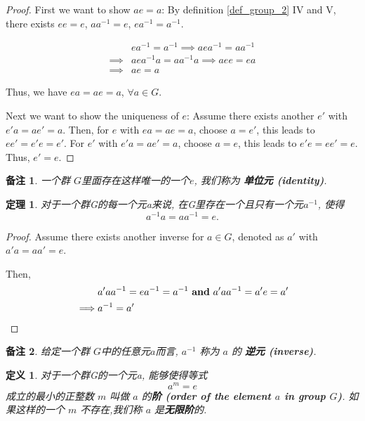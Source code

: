 \documentclass[utf8]{ctexbook}
\newtheorem{theorem}{定理}[section]
\newtheorem{definition}{定义}[section]
\newtheorem{memo}{备注}[section]
\begin{document}
\begin{proof}
First we want to show $ae = a$: By definition \ref{def_group_2} IV and V, there exists $ee=e$, $a a^{-1} = e$, $e a^{-1} =  a^{-1}$.

\begin{align*}
& ea^{-1} = a^{-1} \implies a e a^{-1} = a a^{-1} \\
\implies & a e a^{-1} a = a a^{-1} a \implies a e e = e a \\
\implies & a e = a
\end{align*}

Thus, we have $ea = a e = a$, $\forall a \in G$.

Next we want to show the uniqueness of $e$: Assume there exists another $e'$ with $e' a = a e' = a$. Then, for $e$ with $ea = a e = a$, choose $a = e'$, this leads to $e e' = e' e = e'$. For $e'$ with $e' a = a e' = a$, choose $a= e$, this leads to $e' e = e e' = e$. Thus, $e' = e$.

\end{proof}

\begin{memo}
一个群 $G$里面存在这样唯一的一个$e$, 我们称为 \textbf{单位元 (identity)}.
\end{memo}

\begin{theorem}
对于一个群G的每一个元a来说, 在G里存在一个且只有一个元$a^{-1}$, 使得
\begin{equation}
a^{-1} a = a a^{-1} = e .
\end{equation}
\end{theorem}


\begin{proof}
Assume there exists another inverse for $a \in G$, denoted as $a'$ with $a' a = a a' = e$.


Then,
\begin{align*}
& a' a a^{-1} = e a^{-1} = a^{-1} \mbox{ \textbf{and} } a' a a^{-1} = a' e = a' \\
\implies & a^{-1} = a'
\end{align*}
\end{proof}

\begin{memo}
给定一个群 $G$中的任意元$a$而言, $a^{-1}$ 称为 $a$ 的 \textbf{逆元 (inverse)}.
\end{memo}


\begin{definition}
对于一个群G的一个元a, 能够使得等式
\begin{equation}
a^m = e
\end{equation}
成立的最小的正整数 $m$ 叫做 $a$ 的\textbf{阶 (order of the element $a$ in group $G$)}. 如果这样的一个 $m$ 不存在,我们称 $a$ 是\textbf{无限阶}的.
\end{definition}
\end{document}
